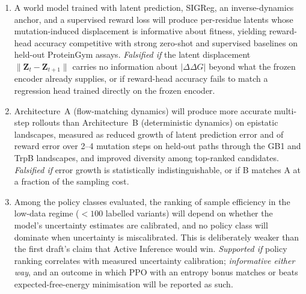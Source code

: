 \documentclass[12pt, a4paper]{article}
\begin{document}
\begin{enumerate}
    \item[\textbf{H1.}] A world model trained with latent prediction, SIGReg, an inverse-dynamics anchor, and a supervised reward loss will produce per-residue latents whose mutation-induced displacement is informative about fitness, yielding reward-head accuracy competitive with strong zero-shot and supervised baselines on held-out ProteinGym assays. \textit{Falsified if} the latent displacement $\lVert \mathbf{Z}_t - \mathbf{Z}_{t+1} \rVert$ carries no information about $\lvert \Delta\Delta G \rvert$ beyond what the frozen encoder already supplies, or if reward-head accuracy fails to match a regression head trained directly on the frozen encoder.

    \item[\textbf{H2.}] Architecture~A (flow-matching dynamics) will produce more accurate multi-step rollouts than Architecture~B (deterministic dynamics) on epistatic landscapes, measured as reduced growth of latent prediction error and of reward error over 2--4 mutation steps on held-out paths through the GB1 and TrpB landscapes, and improved diversity among top-ranked candidates. \textit{Falsified if} error growth is statistically indistinguishable, or if B matches A at a fraction of the sampling cost.

    \item[\textbf{H3.}] Among the policy classes evaluated, the ranking of sample efficiency in the low-data regime ($<100$ labelled variants) will depend on whether the model's uncertainty estimates are calibrated, and no policy class will dominate when uncertainty is miscalibrated. This is deliberately weaker than the first draft's claim that Active Inference would win. \textit{Supported if} policy ranking correlates with measured uncertainty calibration; \textit{informative either way}, and an outcome in which PPO with an entropy bonus matches or beats expected-free-energy minimisation will be reported as such.


\end{enumerate}
\end{document}
